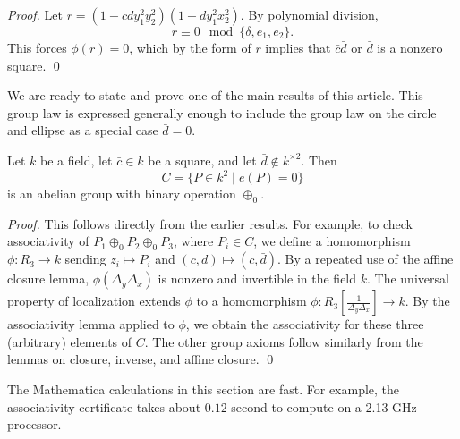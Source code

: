 \documentclass{llncs}
\newcommand{\f}[1]{\frac{1}{#1}}
\begin{document}
\begin{proof} 
  Let $r = (1 - c d y_1^2 y_2 ^2) (1 - d y_1^2 x_2^2)$.  By polynomial
  division,
\begin{equation}\label{eqn:squares}
  r \equiv 0 \mod \{\delta,e_1,e_2\}.
\end{equation}
This forces $\phi(r)=0$, which by the form of $r$ implies that $\bar
c\bar d$ or $\bar d$ is a nonzero square.
\qed\end{proof}

We are ready to state and prove one of the main results of this
article.  This group law is expressed generally enough
to include the group law on the circle and ellipse as a special case
$\bar d = 0$.

\begin{theorem}\label{thm:group} 
  Let $k$ be a field, let $\bar c \in k$ be a square, and let $\bar
  d\not\in k^{\times 2}$.  
  Then 
  \[
  C= \{P\in k^2 \mid  e(P) = 0\}
  \]
   is an abelian
  group with binary operation $\oplus_0$.
\end{theorem}

\begin{proof} This follows directly from the earlier results.  For
  example, to check associativity of $P_1\oplus_0 P_2\oplus_0 P_3$, where
  $P_i\in C$, we define a homomorphism $\phi:R_3\to k$ sending
  $z_i\mapsto P_i$ and $(c,d)\mapsto (\bar c,\bar d)$.  By a repeated
  use of the affine closure lemma, $\phi(\Delta_y\Delta_x)$ is nonzero
  and invertible in the field $k$.  The universal property of
  localization extends $\phi$ to a homomorphism
  $\phi:R_3[\f{\Delta_y\Delta_x}]\to k$.  By the associativity lemma
  applied to $\phi$, we obtain the associativity for these three
  (arbitrary) elements of $C$.  The other group axioms follow similarly
  from the lemmas on closure, inverse, and affine closure.
\qed\end{proof}

The Mathematica calculations in this section are fast. For example,
the associativity certificate takes about $0.12$ second to compute on
a 2.13 GHz processor.  
\end{document}
